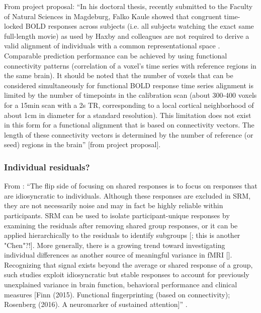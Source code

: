 From project proposal: ``In his doctoral thesis, recently submitted to the
Faculty of Natural Sciences in Magdeburg, Falko Kaule showed that congruent
time-locked BOLD responses across subjects (i.e. all subjects watching the exact
same full-length movie) as used by Haxby and colleagues are not required to
derive a valid alignment of individuals with a common representational space
\citep{kaule2017examination}.
%
Comparable prediction performance can be achieved by using functional
connectivity patterns (correlation of a voxel's time series with reference
regions in the same brain).
%
It should be noted that the number of voxels that can be considered
simultaneously for functional BOLD response time series alignment is limited by
the number of timepoints in the calibration scan (about 300-400 voxels for a
15min scan with a 2s TR, corresponding to a local cortical neighborhood of about
1cm in diameter for a standard resolution).
%
This limitation does not exist in this form for a functional alignment that is
based on connectivity vectors.
%
The length of these connectivity vectors is determined by the number of
reference (or seed) regions in the brain'' [from project proposal].



\subsubsection{Individual residuals?}




%
From \citep{cohen2017computational}: ``The flip side of focusing on shared
responses is to focus on responses that are idiosyncratic to individuals.
Although these responses are excluded in SRM, they are not necessarily noise and
may in fact be highly reliable within participants.
%
SRM can be used to isolate participant-unique responses by examining the
residuals after removing shared group responses, or it can be applied
hierarchically to the residuals to identify subgroups [\citet{chen2017shared};
this is another "Chen"?!].
%
More generally, there is a growing trend toward investigating individual
differences as another source of meaningful variance in fMRI
[\citep{dubois2016building}].
%
Recognizing that signal exists beyond the average or shared response of a group,
such studies exploit idiosyncratic but stable responses to account for
previously unexplained variance in brain function, behavioral performance and
clinical measures [Finn (2015). Functional fingerprinting (based on
connectivity); Rosenberg (2016). A neuromarker of sustained attention]''
\citep{cohen2017computational}.


